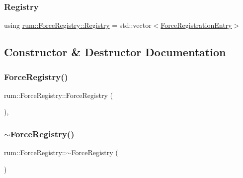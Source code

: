 \subsubsection{\texorpdfstring{Registry}{Registry}}
{\footnotesize\ttfamily using \mbox{\hyperlink{classrum_1_1_force_registry_a4a52c8f9558a80eea2e47e328b687c77}{rum\+::\+Force\+Registry\+::\+Registry}} =  std\+::vector$<$\mbox{\hyperlink{structrum_1_1_force_registry_1_1_force_registration_entry}{Force\+Registration\+Entry}}$>$}



\subsection{Constructor \& Destructor Documentation}
\mbox{\label{classrum_1_1_force_registry_aa45ab19bcf87ffb0f3dfc73dd7a3beac}} 
\subsubsection{\texorpdfstring{Force\+Registry()}{ForceRegistry()}}
{\footnotesize\ttfamily rum\+::\+Force\+Registry\+::\+Force\+Registry (\begin{DoxyParamCaption}{ }\end{DoxyParamCaption})\hspace{0.3cm}{\ttfamily [explicit]}, {\ttfamily [default]}}

\mbox{\label{classrum_1_1_force_registry_aacf8096092db2532452f25e1a1a66515}} 
\subsubsection{\texorpdfstring{$\sim$\+Force\+Registry()}{~ForceRegistry()}}
{\footnotesize\ttfamily rum\+::\+Force\+Registry\+::$\sim$\+Force\+Registry (\begin{DoxyParamCaption}{ }\end{DoxyParamCaption})\hspace{0.3cm}{\ttfamily [default]}}



